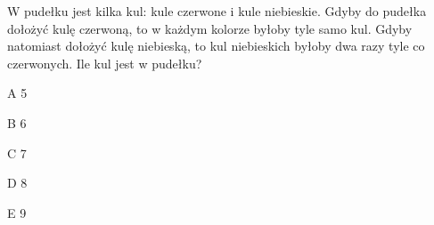\begin{tresc}
W pudełku jest kilka kul: kule czerwone i kule niebieskie. Gdyby do pudełka dołożyć kulę czerwoną, to w każdym kolorze byłoby tyle samo kul. Gdyby natomiast dołożyć kulę niebieską, to kul niebieskich byłoby dwa razy tyle co czerwonych. Ile kul jest w pudełku?
\end{tresc}
\begin{wariant}{A} 5 \end{wariant}
\begin{wariant}{B} 6 \end{wariant}
\begin{wariant}{C} 7 \end{wariant}
\begin{wariant}{D} 8 \end{wariant}
\begin{wariant}{E} 9 \end{wariant}
